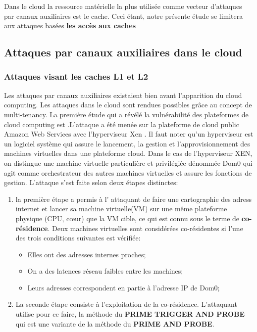 Dans le cloud la ressource matérielle la plus utilisée comme vecteur d’attaques par canaux auxiliaires  est le cache. Ceci étant, notre présente étude se limitera aux attaques basées \textbf{les accès aux caches}
\subsection{Attaques par canaux auxiliaires dans le cloud}
\subsubsection{Attaques visant les caches L1 et L2}
Les attaques par canaux auxiliaires existaient bien avant l’apparition du cloud computing. Les attaques dans le cloud sont rendues possibles grâce au concept de multi-tenancy. La première étude qui a révélé la vulnérabilité  des plateformes de cloud computing est \cite{Ris2009}.L’attaque  a été menée sur  la plateforme de cloud public Amazon Web Services \cite{amazon} avec l’hyperviseur Xen \cite{xen}. Il faut noter qu’un hyperviseur est un logiciel système qui assure le lancement, la gestion et l’approvisionnement des machines virtuelles dans une plateforme cloud. Dans le cas de l’hyperviseur XEN, on distingue une machine virtuelle particulière et  privilégiée dénommée Dom0 qui agit comme orchestrateur des autres machines virtuelles et assure les fonctions de gestion. L’attaque s’est faite selon deux étapes distinctes:
\begin{enumerate} 
\item la première étape  a permis à  l' attaquant de faire une cartographie des adress internet et lancer sa machine virtuelle(VM) sur une même plateforme physique (CPU, cœur)  que la VM cible, ce qui est  connu sous le terme de \textbf{co-résidence}. Deux machines virtuelles sont considérées co-résidentes si l’une des trois conditions suivantes est vérifiée:
\begin{itemize}
 \item Elles ont des adresses internes proches;
 \item On a des latences réseau faibles entre les machines;
 \item Leurs adresses correspondent en partie à l’adresse  IP de Dom0;
\end{itemize}
\item La seconde étape consiste à l’exploitation de la co-résidence. L’attaquant utilise pour ce faire, la méthode du \textbf{PRIME TRIGGER AND PROBE}  qui est une variante de la méthode  du \textbf{ PRIME AND PROBE}.
\end{enumerate}

